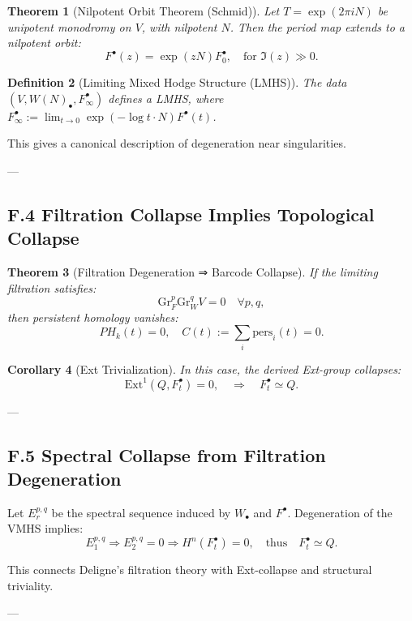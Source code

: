 \documentclass[11pt]{article}
\newtheorem{theorem}{Theorem}[section]
\newtheorem{definition}[theorem]{Definition}
\newtheorem{corollary}[theorem]{Corollary}
\begin{document}
\begin{theorem}[Nilpotent Orbit Theorem (Schmid)]
Let $T = \exp(2\pi i N)$ be unipotent monodromy on $V$, with nilpotent $N$. Then the period map extends to a nilpotent orbit:
\[
F^\bullet(z) = \exp(z N) F^\bullet_0,
\quad \text{for } \Im(z) \gg 0.
\]
\end{theorem}

\begin{definition}[Limiting Mixed Hodge Structure (LMHS)]
The data $(V, W(N)_\bullet, F^\bullet_\infty)$ defines a LMHS,  
where $F^\bullet_\infty := \lim_{t \to 0} \exp(-\log t \cdot N) F^\bullet(t)$.
\end{definition}

This gives a canonical description of degeneration near singularities.

---

\subsection*{F.4 Filtration Collapse Implies Topological Collapse}

\begin{theorem}[Filtration Degeneration ⇒ Barcode Collapse]
If the limiting filtration satisfies:
\[
\mathrm{Gr}_F^p \mathrm{Gr}_W^q V = 0 \quad \forall p,q,
\]
then persistent homology vanishes:
\[
PH_k(t) = 0, \quad C(t) := \sum_i \text{pers}_i(t) = 0.
\]
\end{theorem}

\begin{corollary}[Ext Trivialization]
In this case, the derived Ext-group collapses:
\[
\mathrm{Ext}^1(Q, F^\bullet_t) = 0,
\quad \Rightarrow \quad
F^\bullet_t \simeq Q.
\]
\end{corollary}

---

\subsection*{F.5 Spectral Collapse from Filtration Degeneration}

Let $E_r^{p,q}$ be the spectral sequence induced by $W_\bullet$ and $F^\bullet$.  
Degeneration of the VMHS implies:
\[
E_1^{p,q} \Rightarrow E_2^{p,q} = 0 \Rightarrow H^n(F^\bullet_t) = 0,
\quad \text{thus} \quad F^\bullet_t \simeq Q.
\]

This connects Deligne’s filtration theory with Ext-collapse and structural triviality.

---
\end{document}
